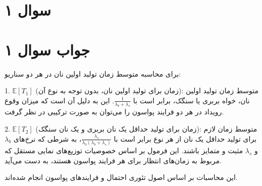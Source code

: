 \section*{سوال ۱}



\section*{جواب سوال ۱}

برای محاسبه متوسط زمان تولید اولین نان در هر دو سناریو:

1. \( \mathbb{E}[T_1] \) (زمان برای تولید اولین نان، بدون توجه به نوع آن): متوسط زمان تولید اولین نان، خواه بربری یا سنگک، برابر است با \( \frac{1}{\lambda_b + \lambda_s} \). این به دلیل آن است که میزان وقوع رویداد در هر دو فرایند پواسون را می‌توان به صورت ترکیبی در نظر گرفت.

2. \( \mathbb{E}[T_2] \) (زمان برای تولید حداقل یک نان بربری و یک نان سنگک): متوسط زمان لازم برای تولید حداقل یک نان از هر نوع برابر است با \( \frac{\lambda_s}{\lambda_b(\lambda_b + \lambda_s)} \)، به شرطی که نرخ‌های \( \lambda_b \) و \( \lambda_s \) مثبت و متمایز باشند. این فرمول بر اساس خصوصیات توزیع‌های نمایی مستقل که مربوط به زمان‌های انتظار برای هر فرایند پواسون هستند، به دست می‌آید.

این محاسبات بر اساس اصول تئوری احتمال و فرایندهای پواسون انجام شده‌اند.
